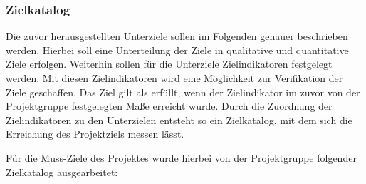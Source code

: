\subsubsection{Zielkatalog}
\label{sec:Zielkatalog}

Die zuvor herausgestellten Unterziele sollen im Folgenden genauer beschrieben
werden. Hierbei soll eine Unterteilung der Ziele in qualitative und quantitative
Ziele erfolgen. Weiterhin sollen für die Unterziele Zielindikatoren festgelegt
werden. Mit diesen Zielindikatoren wird eine Möglichkeit zur Verifikation der
Ziele geschaffen. Das Ziel gilt als erfüllt, wenn der Zielindikator im zuvor von
der Projektgruppe festgelegten Maße erreicht wurde. Durch die Zuordnung der
Zielindikatoren zu den Unterzielen entsteht so ein Zielkatalog, mit dem sich
die Erreichung des Projektziels messen lässt.

Für die Muss-Ziele des Projektes wurde hierbei von der Projektgruppe folgender
Zielkatalog ausgearbeitet:

